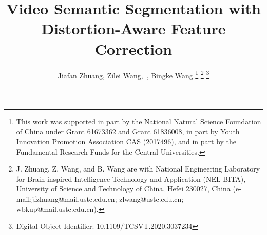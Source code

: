 \documentclass[journal]{IEEEtran}
\begin{document}
\title{Video Semantic Segmentation with \\ Distortion-Aware Feature Correction}




\author{Jiafan Zhuang, Zilei Wang,~, Bingke Wang \thanks{This work was supported in part by the National Natural
		Science Foundation of China under Grant 61673362 and Grant 61836008,
		in part by Youth Innovation Promotion Association CAS (2017496), and in part by
		the Fundamental Research Funds for the Central Universities.}
	\thanks{J. Zhuang, Z. Wang, and B. Wang are with National Engineering Laboratory for Brain-inspired Intelligence Technology and Application (NEL-BITA), University of Science and Technology of China, Hefei 230027, China (e-mail:jfzhuang@mail.ustc.edu.cn; zlwang@ustc.edu.cn; wbkup@mail.ustc.edu.cn).}
	\thanks{Digital Object Identifier: 10.1109/TCSVT.2020.3037234}}

















\newcommand{\etal}{\textit{et al}.}
\newcommand{\ie}{\textit{i}.\textit{e}.}
\newcommand{\eg}{\textit{e}.\textit{g}.}
\newcommand{\vs}{vs. }

\maketitle
\end{document}
